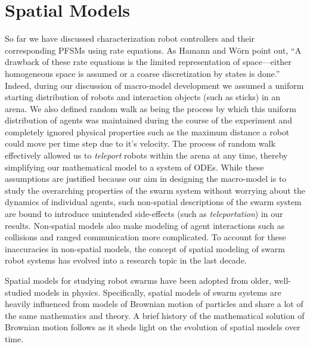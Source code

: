 \documentclass[Main.tex]{subfiles}
\begin{document}
\section{Spatial Models}\label{sec:spatial}
So far we have discussed characterization robot controllers and their corresponding PFSMs using rate equations. As Hamann and W\"{o}rn\cite{Hamann2008} point out, ``A drawback of these rate equations is the limited representation of space---either homogeneous space is assumed or a coarse discretization by states is done.'' Indeed, during our discussion of macro-model development we assumed a uniform starting distribution of robots and interaction objects (such as sticks) in an arena. We also defined random walk as being the process by which this uniform distribution of agents was maintained during the course of the experiment and completely ignored physical properties such as the maximum distance a robot could move per time step due to it's velocity. The process of random walk effectively allowed us to \emph{teleport} robots within the arena at any time, thereby simplifying our mathematical model to a system of ODEs. While these assumptions are justified because our aim in designing the macro-model is to study the overarching properties of the swarm system without worrying about the dynamics of individual agents, such non-spatial descriptions of the swarm system are bound to introduce unintended side-effects (such as \emph{teleportation}) in our results. Non-spatial models also make modeling of agent interactions such as collisions and ranged communication more complicated. To account for these inaccuracies in non-spatial models, the concept of spatial modeling of swarm robot systems has evolved into a research topic in the last decade.

Spatial models for studying robot swarms have been adopted from older, well-studied models in physics. Specifically, spatial models of swarm systems are heavily influenced from models of Brownian motion of particles and share a lot of the same mathematics and theory. A brief history of the mathematical solution of Brownian motion follows as it sheds light on the evolution of spatial models over time. 
\end{document}
